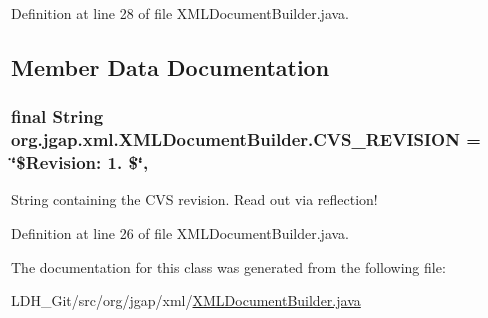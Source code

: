 Definition at line 28 of file X\-M\-L\-Document\-Builder.\-java.



\subsection{Member Data Documentation}
\hypertarget{classorg_1_1jgap_1_1xml_1_1_x_m_l_document_builder_a1174960a805366ca3ccd7fe5e3fb92f7}{
\subsubsection[{C\-V\-S\-\_\-\-R\-E\-V\-I\-S\-I\-O\-N}]{\setlength{\rightskip}{0pt plus 5cm}final String org.\-jgap.\-xml.\-X\-M\-L\-Document\-Builder.\-C\-V\-S\-\_\-\-R\-E\-V\-I\-S\-I\-O\-N = \char`\"{}\$Revision\-: 1. \$\char`\"{}\hspace{0.3cm}{\ttfamily [static]}, {\ttfamily [private]}}}\label{classorg_1_1jgap_1_1xml_1_1_x_m_l_document_builder_a1174960a805366ca3ccd7fe5e3fb92f7}
String containing the C\-V\-S revision. Read out via reflection! 

Definition at line 26 of file X\-M\-L\-Document\-Builder.\-java.



The documentation for this class was generated from the following file\-:\begin{DoxyCompactItemize}
\item 
L\-D\-H\-\_\-\-Git/src/org/jgap/xml/\hyperlink{_x_m_l_document_builder_8java}{X\-M\-L\-Document\-Builder.\-java}\end{DoxyCompactItemize}
